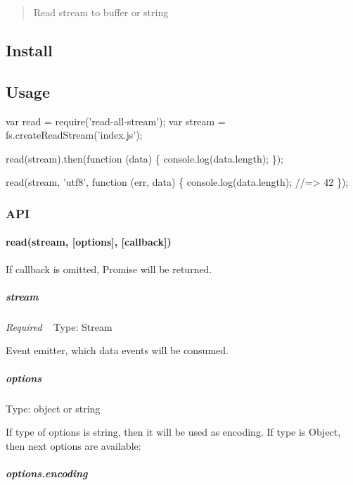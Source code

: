 \begin{quote}
Read stream to buffer or string \end{quote}


\subsection*{Install}




\subsection*{Usage}


\begin{DoxyCode}
var read = require('read-all-stream');
var stream = fs.createReadStream('index.js');

read(stream).then(function (data) \{
    console.log(data.length);
\});

read(stream, 'utf8', function (err, data) \{
    console.log(data.length);
    //=> 42
\});
\end{DoxyCode}


\subsubsection*{A\+PI}

\paragraph*{read(stream, \mbox{[}options\mbox{]}, \mbox{[}callback\mbox{]})}

If callback is omitted, Promise will be returned.

\subparagraph*{stream}

{\itshape Required} ~\newline
Type\+: {\ttfamily Stream}

Event emitter, which {\ttfamily data} events will be consumed.

\subparagraph*{options}

Type\+: {\ttfamily object} or {\ttfamily string}

If type of {\ttfamily options} is {\ttfamily string}, then it will be used as encoding. If type is {\ttfamily Object}, then next options are available\+:

\subparagraph*{options.\+encoding}

